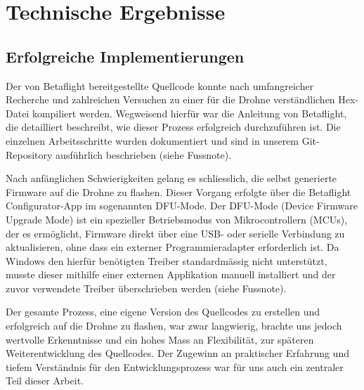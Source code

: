 \begin{comment}
\subsection{Ergebnisse}
Wurden auffällige Datenmuster identifiziert? Was wurde herausgefunden? 

Wider erwarten wurde ein auffälliges Datenmuster festgestellt. Dies war sehr irritierend, da tausende diese Open-Source-Software benutzen. Später haben wir festgestellt, dass diese Auffälligkeit an unserer Berechnung lag und mit der neuen verbesserten Rechnung wurden keine auffälligen Datenmuster mehr erkannt und alles lief wie es sollte.
\end{comment}
\section{Technische Ergebnisse}

\subsection{Erfolgreiche Implementierungen}
Der von Betaflight bereitgestellte Quellcode konnte nach umfangreicher Recherche und zahlreichen Versuchen zu einer für die Drohne verständlichen Hex-Datei kompiliert werden. Wegweisend hierfür war die Anleitung von Betaflight, die detailliert beschreibt, wie dieser Prozess erfolgreich durchzuführen ist. Die einzelnen Arbeitsschritte wurden dokumentiert und sind in unserem Git-Repository ausführlich beschrieben (siehe Fussnote).

Nach anfänglichen Schwierigkeiten gelang es schliesslich, die selbst generierte Firmware auf die Drohne zu flashen. Dieser Vorgang erfolgte über die Betaflight Configurator-App im sogenannten DFU-Mode. Der DFU-Mode (Device Firmware Upgrade Mode) ist ein spezieller Betriebsmodus von Mikrocontrollern (MCUs), der es ermöglicht, Firmware direkt über eine USB- oder serielle Verbindung zu aktualisieren, ohne dass ein externer Programmieradapter erforderlich ist. Da Windows den hierfür benötigten Treiber standardmässig nicht unterstützt, musste dieser mithilfe einer externen Applikation manuell installiert und der zuvor verwendete Treiber überschrieben werden (siehe Fussnote).

Der gesamte Prozess, eine eigene Version des Quellcodes zu erstellen und erfolgreich auf die Drohne zu flashen, war zwar langwierig, brachte uns jedoch wertvolle Erkenntnisse und ein hohes Mass an Flexibilität, zur späteren Weiterentwicklung des Quellcodes. Der Zugewinn an praktischer Erfahrung und tiefem Verständnis für den Entwicklungsprozess war für uns auch ein zentraler Teil dieser Arbeit.

